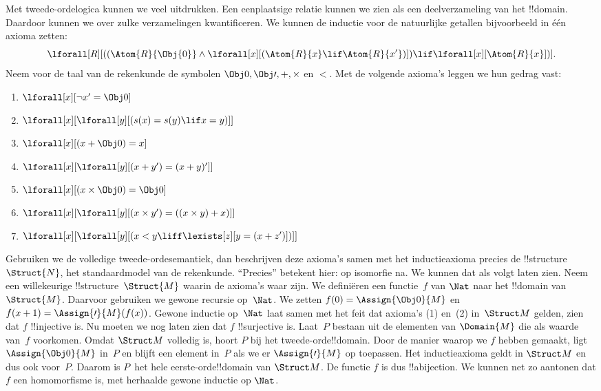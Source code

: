 \documentclass[../../../include/open-logic-section]{subfiles}
\begin{document}
Met tweede-ordelogica kunnen we veel uitdrukken. Een eenplaatsige relatie
kunnen we zien als een deelverzameling van het !!{domain}. Daardoor kunnen we
over zulke verzamelingen kwantificeren. We kunnen de inductie voor de
natuurlijke getallen bijvoorbeeld in één axioma zetten:
\[
\lforall[R][((\Atom{R}{\Obj{0}} \land \lforall[x][(\Atom{R}{x} \lif
    \Atom{R}{x'})]) \lif \lforall[x][\Atom{R}{x}])].
\]
Neem voor de taal van de rekenkunde de symbolen $\Obj 0, \Obj \prime, +,
\times$ en $<$. Met de volgende axioma's leggen we hun gedrag vast:
\begin{enumerate}
\item $\lforall[x][\lnot x' = \Obj 0]$
\item $\lforall[x][\lforall[y][(s(x) = s(y) \lif x = y)]]$
\item $\lforall[x][(x + \Obj 0) = x]$
\item $\lforall[x][\lforall[y][(x + y') = (x + y)']]$
\item $\lforall[x][(x \times \Obj 0) = \Obj 0]$
\item $\lforall[x][\lforall[y][(x \times y') = ((x \times y) + x)]]$
\item $\lforall[x][\lforall[y][(x < y \liff \lexists[z][y = (x + z')])]]$
\end{enumerate}
Gebruiken we de volledige tweede-ordesemantiek, dan beschrijven deze axioma's
samen met het inductieaxioma precies de !!{structure}~$\Struct{N}$, het
standaardmodel van de rekenkunde. ``Precies'' betekent hier: op isomorfie na.
We kunnen dat als volgt laten zien. Neem een willekeurige
!!{structure}~$\Struct{M}$ waarin de axioma's waar zijn. We definiëren een
functie~$f$ van $\Nat$ naar het !!{domain} van $\Struct{M}$. Daarvoor
gebruiken we gewone recursie op~$\Nat$. We zetten
$f(0) = \Assign{\Obj 0}{M}$ en
$f(x+1) = \Assign{\prime}{M}(f(x))$. Gewone inductie op~$\Nat$ laat samen
met het feit dat axioma's (1) en~(2) in~$\Struct M$ gelden, zien dat $f$
!!{injective} is. Nu moeten we nog laten
zien dat $f$ !!{surjective} is. Laat~$P$ bestaan uit de elementen van
$\Domain{M}$ die als waarde van~$f$ voorkomen. Omdat $\Struct M$ volledig is,
hoort $P$ bij het tweede-orde!!{domain}. Door de manier waarop we $f$ hebben
gemaakt, ligt $\Assign{\Obj 0}{M}$ in~$P$ en blijft een element in~$P$ als we
er $\Assign{\prime}{M}$ op toepassen. Het inductieaxioma geldt in $\Struct M$
en dus ook voor~$P$. Daarom is $P$~het hele eerste-orde!!{domain} van
$\Struct M$. De functie $f$ is dus !!a{bijection}. We kunnen net zo aantonen
dat $f$ een homomorfisme is, met herhaalde gewone inductie op $\Nat$.
\end{document}
